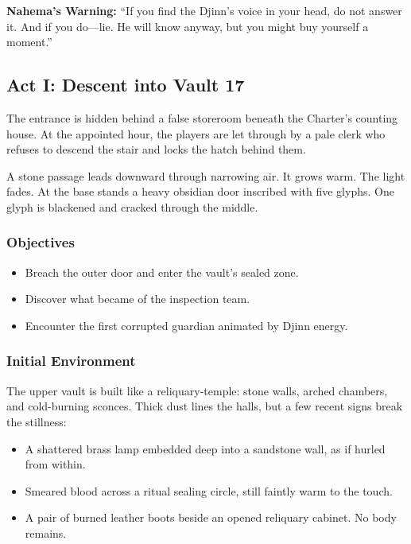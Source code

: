 \textbf{Nahema’s Warning:} “If you find the Djinn’s voice in your head, do not answer it. And if you do—lie. He will know anyway, but you might buy yourself a moment.”


\subsection{Act I: Descent into Vault 17}

The entrance is hidden behind a false storeroom beneath the Charter’s counting house. At the appointed hour, the players are let through by a pale clerk who refuses to descend the stair and locks the hatch behind them.

A stone passage leads downward through narrowing air. It grows warm. The light fades. At the base stands a heavy obsidian door inscribed with five glyphs. One glyph is blackened and cracked through the middle.

\subsubsection*{Objectives}
\begin{itemize}
    \item Breach the outer door and enter the vault’s sealed zone.
    \item Discover what became of the inspection team.
    \item Encounter the first corrupted guardian animated by Djinn energy.
\end{itemize}

\subsubsection*{Initial Environment}

The upper vault is built like a reliquary-temple: stone walls, arched chambers, and cold-burning sconces. Thick dust lines the halls, but a few recent signs break the stillness:

\begin{itemize}
    \item A shattered brass lamp embedded deep into a sandstone wall, as if hurled from within.
    \item Smeared blood across a ritual sealing circle, still faintly warm to the touch.
    \item A pair of burned leather boots beside an opened reliquary cabinet. No body remains.
\end{itemize}

